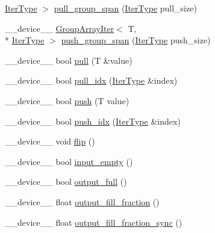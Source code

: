 \begin{DoxyCompactItemize}
\hyperlink{structutil_1_1IOBuffer_aa942c705a66498986a60878c9fc125c0}{Iter\-Type} $>$ \hyperlink{structutil_1_1IOBuffer_a555ba329426d0f6a3ab3493b0f64aaaf}{pull\-\_\-group\-\_\-span} (\hyperlink{structutil_1_1IOBuffer_aa942c705a66498986a60878c9fc125c0}{Iter\-Type} pull\-\_\-size)
\item 
\-\_\-\-\_\-device\-\_\-\-\_\- \hyperlink{structutil_1_1GroupArrayIter}{Group\-Array\-Iter}$<$ T, \\*
\hyperlink{structutil_1_1IOBuffer_aa942c705a66498986a60878c9fc125c0}{Iter\-Type} $>$ \hyperlink{structutil_1_1IOBuffer_a181df9e029871e72560d07c0522b64c0}{push\-\_\-group\-\_\-span} (\hyperlink{structutil_1_1IOBuffer_aa942c705a66498986a60878c9fc125c0}{Iter\-Type} push\-\_\-size)
\item 
\-\_\-\-\_\-device\-\_\-\-\_\- bool \hyperlink{structutil_1_1IOBuffer_ae5586a81e06023daeef33d6c1acd8a84}{pull} (T \&value)
\item 
\-\_\-\-\_\-device\-\_\-\-\_\- bool \hyperlink{structutil_1_1IOBuffer_a3bf2affacee4c3c01f20da28786b0df2}{pull\-\_\-idx} (\hyperlink{structutil_1_1IOBuffer_aa942c705a66498986a60878c9fc125c0}{Iter\-Type} \&index)
\item 
\-\_\-\-\_\-device\-\_\-\-\_\- bool \hyperlink{structutil_1_1IOBuffer_a56717865e45fccec275b4d73de7cd7e5}{push} (T value)
\item 
\-\_\-\-\_\-device\-\_\-\-\_\- bool \hyperlink{structutil_1_1IOBuffer_a9d5904d72563b3dc5671d56b3baee0a5}{push\-\_\-idx} (\hyperlink{structutil_1_1IOBuffer_aa942c705a66498986a60878c9fc125c0}{Iter\-Type} \&index)
\item 
\-\_\-\-\_\-device\-\_\-\-\_\- void \hyperlink{structutil_1_1IOBuffer_ad55042871e00499364db40eb0836fb9f}{flip} ()
\item 
\-\_\-\-\_\-device\-\_\-\-\_\- bool \hyperlink{structutil_1_1IOBuffer_a6df8dc46ff58a71f5df2e5ddca75f8a9}{input\-\_\-empty} ()
\item 
\-\_\-\-\_\-device\-\_\-\-\_\- bool \hyperlink{structutil_1_1IOBuffer_aa12a5e19d6d98f19e522b007e9fa8440}{output\-\_\-full} ()
\item 
\-\_\-\-\_\-device\-\_\-\-\_\- float \hyperlink{structutil_1_1IOBuffer_a2c71e690dca9b48a3fae7bac62e29950}{output\-\_\-fill\-\_\-fraction} ()
\item 
\-\_\-\-\_\-device\-\_\-\-\_\- float \hyperlink{structutil_1_1IOBuffer_ac60342bc022e1159b2b9d1bd87e93144}{output\-\_\-fill\-\_\-fraction\-\_\-sync} ()
\end{DoxyCompactItemize}
